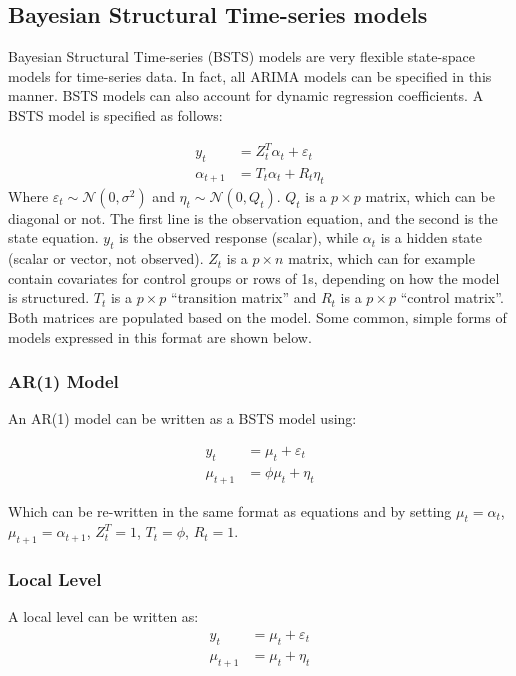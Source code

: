 \documentclass[12pt]{article}
\begin{document}
\subsection{Bayesian Structural Time-series models}
Bayesian Structural Time-series (BSTS) models are very flexible state-space models for time-series data. In fact, all ARIMA models can be specified in this manner. BSTS models can also account for dynamic regression coefficients. A BSTS model is specified as follows:

\begin{align} 
y_t &= Z_t^T\alpha_t + \varepsilon_t\\ \label{eq}
\alpha_{t+1} &= T_t \alpha_t + R_t \eta_t \label{eq1}
\end{align}
Where $\varepsilon_t \sim \mathcal{N}(0, \sigma^2)$ and 
$\eta_t \sim \mathcal{N}(0, Q_t)$. $ Q_t$ is a $p \times p$ matrix, which can be diagonal or not. The first line is the observation equation, and the second is the state equation. $y_t$ is the observed response (scalar), while $\alpha_t$ is a hidden state (scalar or vector, not observed). $Z_t$ is a $p \times n$ matrix, which can for example contain covariates for control groups or rows of 1s, depending on how the model is structured.  $T_t$ is a $p \times p$ ``transition matrix'' and $R_t$ is a $p \times p$ ``control matrix''. Both matrices are populated based on the model. Some common, simple forms of models expressed in this format are shown below. \\

\subsubsection{AR(1) Model}

An AR(1) model  can be written as a BSTS model using:

\begin{align}
    y_t &= \mu_t + \varepsilon_t \\
    \mu_{t+1} &= \phi \mu_t + \eta_t
\end{align}

Which can be re-written in the same format as equations \label{eq} and \label{eq1} by setting $\mu_t = \alpha_t$, $\mu_{t+1} = \alpha_{t+1}$, $Z_t^T = 1$, $T_t = \phi$, $R_t = 1$.


\subsubsection{Local Level}
A local level  can be written as:
\begin{align}
    y_{t} &= \mu_t + \varepsilon_t \\
    \mu_{t+1} &= \mu_t + \eta_t 
    \end{align}
\end{document}
